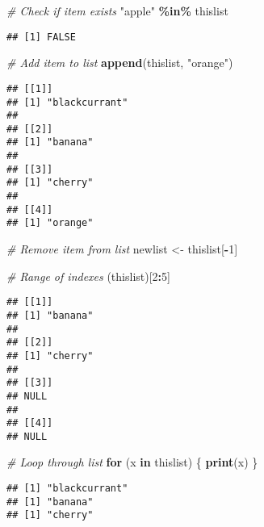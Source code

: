 \documentclass[
]{article}
\newenvironment{Shaded}{\begin{snugshade}}{\end{snugshade}}
\newcommand{\CommentTok}[1]{\textcolor[rgb]{0.56,0.35,0.01}{\textit{#1}}}
\newcommand{\ControlFlowTok}[1]{\textcolor[rgb]{0.13,0.29,0.53}{\textbf{#1}}}
\newcommand{\DecValTok}[1]{\textcolor[rgb]{0.00,0.00,0.81}{#1}}
\newcommand{\FunctionTok}[1]{\textcolor[rgb]{0.13,0.29,0.53}{\textbf{#1}}}
\newcommand{\NormalTok}[1]{#1}
\newcommand{\OtherTok}[1]{\textcolor[rgb]{0.56,0.35,0.01}{#1}}
\newcommand{\SpecialCharTok}[1]{\textcolor[rgb]{0.81,0.36,0.00}{\textbf{#1}}}
\newcommand{\StringTok}[1]{\textcolor[rgb]{0.31,0.60,0.02}{#1}}
\begin{document}
\begin{Shaded}
\begin{Highlighting}[]
\CommentTok{\# Check if item exists}
\StringTok{"apple"} \SpecialCharTok{\%in\%}\NormalTok{ thislist}
\end{Highlighting}
\end{Shaded}

\begin{verbatim}
## [1] FALSE
\end{verbatim}

\begin{Shaded}
\begin{Highlighting}[]
\CommentTok{\# Add item to list}
\FunctionTok{append}\NormalTok{(thislist, }\StringTok{"orange"}\NormalTok{)}
\end{Highlighting}
\end{Shaded}

\begin{verbatim}
## [[1]]
## [1] "blackcurrant"
## 
## [[2]]
## [1] "banana"
## 
## [[3]]
## [1] "cherry"
## 
## [[4]]
## [1] "orange"
\end{verbatim}

\begin{Shaded}
\begin{Highlighting}[]
\CommentTok{\# Remove item from list}
\NormalTok{newlist }\OtherTok{\textless{}{-}}\NormalTok{ thislist[}\SpecialCharTok{{-}}\DecValTok{1}\NormalTok{]}

\CommentTok{\# Range of indexes}
\NormalTok{(thislist)[}\DecValTok{2}\SpecialCharTok{:}\DecValTok{5}\NormalTok{]}
\end{Highlighting}
\end{Shaded}

\begin{verbatim}
## [[1]]
## [1] "banana"
## 
## [[2]]
## [1] "cherry"
## 
## [[3]]
## NULL
## 
## [[4]]
## NULL
\end{verbatim}

\begin{Shaded}
\begin{Highlighting}[]
\CommentTok{\# Loop through list}
\ControlFlowTok{for}\NormalTok{ (x }\ControlFlowTok{in}\NormalTok{ thislist) \{}
  \FunctionTok{print}\NormalTok{(x)}
\NormalTok{\}}
\end{Highlighting}
\end{Shaded}

\begin{verbatim}
## [1] "blackcurrant"
## [1] "banana"
## [1] "cherry"
\end{verbatim}
\end{document}
